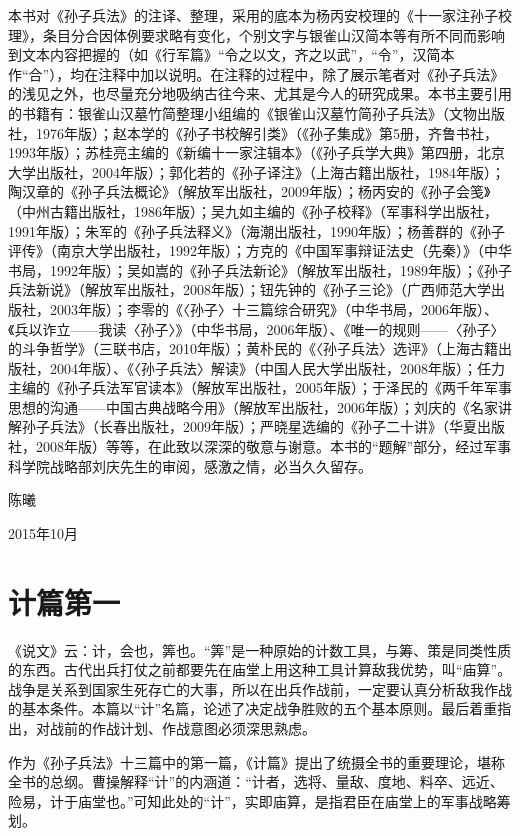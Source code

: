 \documentclass[12pt,UTF8]{ctexbook}
\begin{document}
本书对《孙子兵法》的注译、整理，采用的底本为杨丙安校理的《十一家注孙子校理》，条目分合因体例要求略有变化，个别文字与银雀山汉简本等有所不同而影响到文本内容把握的（如《行军篇》“令之以文，齐之以武”，“令”，汉简本作“合”），均在注释中加以说明。在注释的过程中，除了展示笔者对《孙子兵法》的浅见之外，也尽量充分地吸纳古往今来、尤其是今人的研究成果。本书主要引用的书籍有：银雀山汉墓竹简整理小组编的《银雀山汉墓竹简孙子兵法》（文物出版社，1976年版）；赵本学的《孙子书校解引类》（《孙子集成》第5册，齐鲁书社，1993年版）；苏桂亮主编的《新编十一家注辑本》（《孙子兵学大典》第四册，北京大学出版社，2004年版）；郭化若的《孙子译注》（上海古籍出版社，1984年版）；陶汉章的《孙子兵法概论》（解放军出版社，2009年版）；杨丙安的《孙子会笺》（中州古籍出版社，1986年版）；吴九如主编的《孙子校释》（军事科学出版社，1991年版）；朱军的《孙子兵法释义》（海潮出版社，1990年版）；杨善群的《孙子评传》（南京大学出版社，1992年版）；方克的《中国军事辩证法史（先秦）》（中华书局，1992年版）；吴如嵩的《孙子兵法新论》（解放军出版社，1989年版）；《孙子兵法新说》（解放军出版社，2008年版）；钮先钟的《孙子三论》（广西师范大学出版社，2003年版）；李零的《〈孙子〉十三篇综合研究》（中华书局，2006年版）、《兵以诈立——我读〈孙子〉》（中华书局，2006年版）、《唯一的规则——〈孙子〉的斗争哲学》（三联书店，2010年版）；黄朴民的《〈孙子兵法〉选评》（上海古籍出版社，2004年版）、《〈孙子兵法〉解读》（中国人民大学出版社，2008年版）；任力主编的《孙子兵法军官读本》（解放军出版社，2005年版）；于泽民的《两千年军事思想的沟通——中国古典战略今用》（解放军出版社，2006年版）；刘庆的《名家讲解孙子兵法》（长春出版社，2009年版）；严晓星选编的《孙子二十讲》（华夏出版社，2008年版）等等，在此致以深深的敬意与谢意。本书的“题解”部分，经过军事科学院战略部刘庆先生的审阅，感激之情，必当久久留存。

陈曦

2015年10月

\mainmatter

\chapter{计篇第一}
	
《说文》云：计，会也，筭也。“筭”是一种原始的计数工具，与筹、策是同类性质的东西。古代出兵打仗之前都要先在庙堂上用这种工具计算敌我优势，叫“庙算”。战争是关系到国家生死存亡的大事，所以在出兵作战前，一定要认真分析敌我作战的基本条件。本篇以“计”名篇，论述了决定战争胜败的五个基本原则。最后着重指出，对战前的作战计划、作战意图必须深思熟虑。

作为《孙子兵法》十三篇中的第一篇，《计篇》提出了统摄全书的重要理论，堪称全书的总纲。曹操解释“计”的内涵道：“计者，选将、量敌、度地、料卒、远近、险易，计于庙堂也。”可知此处的“计”，实即庙算，是指君臣在庙堂上的军事战略筹划。
\end{document}
